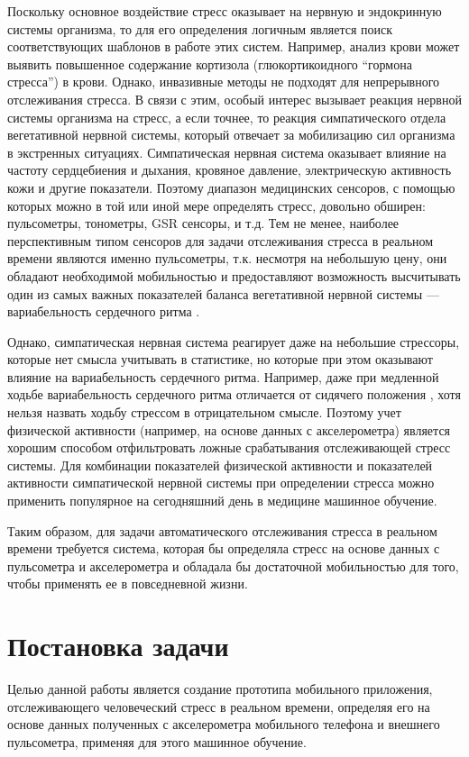 \documentclass[14pt]{matmex-diploma-custom}
\begin{document}
Поскольку основное воздействие стресс оказывает на нервную и эндокринную системы
организма, то для его определения логичным является поиск соответствующих
шаблонов в работе этих систем. Например, анализ крови может выявить повышенное
содержание кортизола (глюкортикоидного ``гормона стресса'') в крови. Однако,
инвазивные методы не подходят для непрерывного отслеживания стресса. В связи с
этим, особый интерес вызывает реакция нервной системы организма на стресс, а
если точнее, то реакция симпатического отдела вегетативной нервной системы,
который отвечает за мобилизацию сил организма в экстренных ситуациях.
Симпатическая нервная система оказывает влияние на частоту сердцебиения и
дыхания, кровяное давление, электрическую активность кожи и другие показатели.
Поэтому диапазон медицинских сенсоров, с помощью которых можно в той или иной
мере определять стресс, довольно обширен: пульсометры, тонометры, GSR сенсоры, и
т.д. Тем не менее, наиболее перспективным типом сенсоров для задачи отслеживания
стресса в реальном времени являются именно пульсометры, т.к. несмотря на
небольшую цену, они обладают необходимой мобильностью и предоставляют
возможность высчитывать один из самых важных показателей баланса вегетативной
нервной системы --- вариабельность сердечного ритма \cite{article:hrv_stress}.

Однако, симпатическая нервная система реагирует даже на небольшие стрессоры,
которые нет смысла учитывать в статистике, но которые при этом оказывают влияние
на вариабельность сердечного ритма. Например, даже при медленной ходьбе
вариабельность сердечного ритма отличается от сидячего положения
\cite{article:hrv_reliability}, хотя нельзя назвать ходьбу стрессом в
отрицательном смысле. Поэтому учет физической активности (например, на основе
данных с акселерометра) является хорошим способом отфильтровать ложные
срабатывания отслеживающей стресс системы. Для комбинации показателей физической
активности и показателей активности симпатической нервной системы при
определении стресса можно применить популярное на сегодняшний день в медицине
машинное обучение.

Таким образом, для задачи автоматического отслеживания стресса в реальном
времени требуется система, которая бы определяла стресс на основе данных с
пульсометра и акселерометра и обладала бы достаточной мобильностью для того,
чтобы применять ее в повседневной жизни.
	
\section{Постановка задачи}
Целью данной работы является создание прототипа мобильного приложения,
отслеживающего человеческий стресс в реальном времени, определяя его на основе
данных полученных с акселерометра мобильного телефона и внешнего пульсометра,
применяя для этого машинное обучение.
\end{document}
